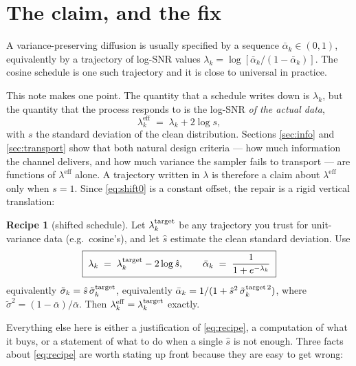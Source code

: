 \documentclass[11pt]{article}
\theoremstyle{definition}
\newtheorem{recipe}[proposition]{Recipe}
\newcommand{\abar}{\bar\alpha}
\newcommand{\sig}{\tilde\sigma}
\newcommand{\leff}{\lambda^{\mathrm{eff}}}
\begin{document}
\section{The claim, and the fix}

A variance-preserving diffusion is usually specified by a sequence
$\abar_k\in(0,1)$, equivalently by a trajectory of log-SNR values
$\lambda_k=\log[\abar_k/(1-\abar_k)]$. The cosine schedule
\cite{nichol2021improved} is one such trajectory and it is close to universal in
practice.

This note makes one point. The quantity that a schedule writes down is
$\lambda_k$, but the quantity that the process responds to is the log-SNR
\emph{of the actual data},
\begin{equation}
  \leff_k \;=\; \lambda_k + 2\log s,
  \label{eq:shift0}
\end{equation}
with $s$ the standard deviation of the clean distribution. Sections
\ref{sec:info} and \ref{sec:transport} show that both natural design criteria
--- how much information the channel delivers, and how much variance the sampler
fails to transport --- are functions of $\leff$ alone. A trajectory written in
$\lambda$ is therefore a claim about $\leff$ only when $s=1$. Since \eqref{eq:shift0}
is a constant offset, the repair is a rigid vertical translation:

\begin{recipe}[shifted schedule]
\label{rec:main}
Let $\lambda^{\rm target}_k$ be any trajectory you trust for unit-variance data
(e.g.\ cosine's), and let $\hat s$ estimate the clean standard deviation. Use
\begin{equation}
  \boxed{\;
  \lambda_k \;=\; \lambda^{\rm target}_k - 2\log\hat s,
  \qquad
  \abar_k \;=\; \frac{1}{1+e^{-\lambda_k}}
  \;}
  \label{eq:recipe}
\end{equation}
equivalently $\sig_k=\hat s\,\sig^{\rm target}_k$, equivalently
$\abar_k=1/(1+\hat s^2\,\sig^{{\rm target}\,2}_k)$, where
$\sig^2=(1-\abar)/\abar$. Then $\leff_k=\lambda^{\rm target}_k$ exactly.
\end{recipe}

Everything else here is either a justification of \eqref{eq:recipe}, a
computation of what it buys, or a statement of what to do when a single $\hat s$
is not enough. Three facts about \eqref{eq:recipe} are worth stating up front
because they are easy to get wrong:
\end{document}
